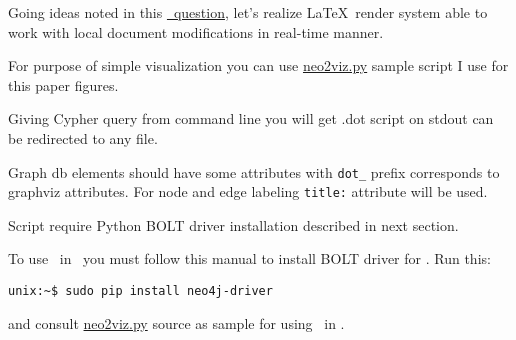 \secdown 
{}

\label{dynatex}

Going ideas noted in this
\href{https://tex.stackexchange.com/questions/633/is-there-any-way-to-get-real-time-compilation-for-latex/391902#391902}{\so\
question}, let's realize \LaTeX\ render system able to work with local document modifications in real-time manner.


For purpose of simple visualization you can use
\href{https://github.com/ponyatov/article/raw/master/neo2viz.py}{neo2viz.py}
sample script I use for this paper figures.

Giving Cypher query from command line you will get .dot script on stdout can be
 redirected to any file.
 
Graph db elements should have some attributes with \verb|dot_| prefix
corresponds to graphviz attributes.
For node and edge labeling \verb|title:| attribute will be used.

Script require Python BOLT driver installation described in next section.


To use \neo\ in \py\ you must follow this manual to install BOLT driver for
\py. Run this:

\begin{verbatim}
unix:~$ sudo pip install neo4j-driver
\end{verbatim}

and consult
\href{https://github.com/ponyatov/article/raw/master/neo2viz.py}{neo2viz.py}
source as sample for using \neo\ in \py.

\secup